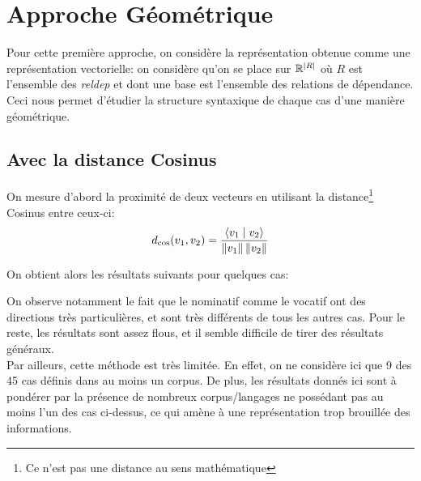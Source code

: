 \documentclass{cours}
\begin{document}
\section{Approche Géométrique}\label{sec:géométrie}
Pour cette première approche, on considère la représentation obtenue comme une représentation vectorielle: on considère qu'on se place sur $\mathbb{R}^{\left|R\right|}$ où $R$ est l'ensemble des \textit{reldep} et dont une base est l'ensemble des relations de dépendance.
Ceci nous permet d'étudier la structure syntaxique de chaque cas d'une manière géométrique.

\subsection{Avec la distance Cosinus}\label{subsec:cosinus}
On mesure d'abord la proximité de deux vecteurs en utilisant la distance\footnote{Ce n'est pas une distance au sens mathématique} Cosinus entre ceux-ci:
\begin{equation}
	d_{\cos}(v_{1},v_{2}) = \frac{\left\langle v_{1}\mid v_{2} \right\rangle}{\left\lVert v_{1} \right\rVert\left\lVert v_{2} \right\rVert}
\end{equation}

On obtient alors les résultats suivants pour quelques cas:







On observe notamment le fait que le nominatif comme le vocatif ont des directions très particulières, et sont très différents de tous les autres cas. Pour le reste, les résultats sont assez flous, et il semble difficile de tirer des résultats généraux.\\
\medskip
Par ailleurs, cette méthode est très limitée. En effet, on ne considère ici que 9 des 45 cas définis dans au moins un corpus.
De plus, les résultats donnés ici sont à pondérer par la présence de nombreux corpus/langages ne possédant pas au moins l'un des cas ci-dessus, ce qui amène à une représentation trop brouillée des informations.
\end{document}
